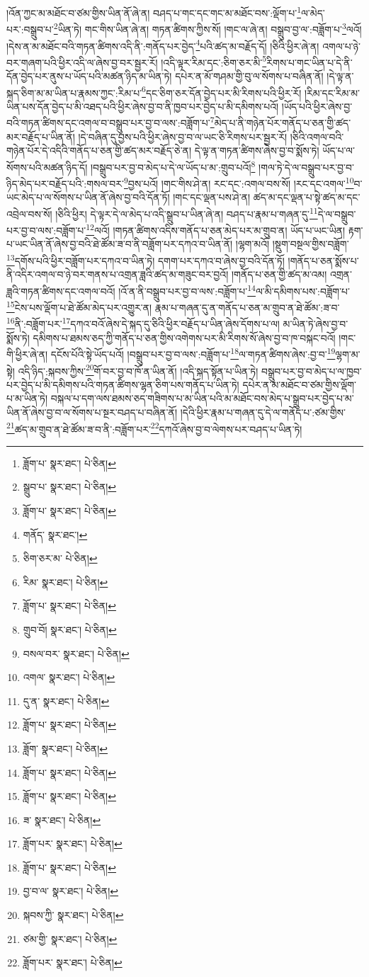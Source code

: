 །འོན་ཀྱང་མ་མཐོང་བ་ཙམ་གྱིས་ཡིན་ནོ་ཞེ་ན། བཤད་པ་གང་དང་གང་མ་མཐོང་བས་:ལྡོག་པ་\footnote{ཟློག་པ་  སྣར་ཐང་།  པེ་ཅིན། }ལ་མེད་པར་:བསྒྲུབ་པ་\footnote{སྒྲུབ་པ་  སྣར་ཐང་།  པེ་ཅིན། }ཡིན་ཏེ། གང་གིས་ཡིན་ཞེ་ན། གཏན་ཚིགས་ཀྱིས་སོ། །གང་ལ་ཞེ་ན། བསྒྲུབ་བྱ་ལ་:བཟློག་པ་\footnote{ཟློག་པ་  སྣར་ཐང་།  པེ་ཅིན། }ལའོ། །དེས་ན་མ་མཐོང་བའི་གཏན་ཚིགས་འདི་ནི་:གནོད་པར་བྱེད་\footnote{གནོད་  སྣར་ཐང་། }པའི་ཚད་མ་བརྗོད་དོ། །ཅིའི་ཕྱིར་ཞེ་ན། འགལ་པ་ཉེ་བར་གཞག་པའི་ཕྱིར་འདི་ལ་ཞེས་བྱ་བར་སྦྱར་རོ། །འདི་ལྟར་རིམ་དང་:ཅིག་ཅར་མི་\footnote{ཅིག་ཅར་མ་  པེ་ཅིན། }རིགས་པ་གང་ཡིན་པ་དེ་ནི་དོན་བྱེད་པར་ནུས་པ་ཡོད་པའི་མཚན་ཉིད་མ་ཡིན་ཏེ། དཔེར་ན་མོ་གཤམ་གྱི་བུ་ལ་སོགས་པ་བཞིན་ནོ། །དེ་ལྟ་ན་སྐད་ཅིག་མ་མ་ཡིན་པ་རྣམས་ཀྱང་:རིམ་པ་\footnote{རིམ་  སྣར་ཐང་།  པེ་ཅིན། }དང་ཅིག་ཅར་དོན་བྱེད་པར་མི་རིགས་པའི་ཕྱིར་རོ། །རིམ་དང་རིམ་མ་ཡིན་པས་དོན་བྱེད་པ་མི་འཐད་པའི་ཕྱིར་ཞེས་བྱ་བ་ནི་ཁྱབ་པར་བྱེད་པ་མི་དམིགས་པའོ། །ཡོད་པའི་ཕྱིར་ཞེས་བྱ་བའི་གཏན་ཚིགས་དང་འགལ་བ་བསྒྲུབ་པར་བྱ་བ་ལས་:བཟློག་པ་\footnote{ཟློག་པ་  སྣར་ཐང་།  པེ་ཅིན། }མེད་པ་ནི་གཉེན་པོར་གནོད་པ་ཅན་གྱི་ཚད་མར་བརྗོད་པ་ཡིན་ནོ། །དེ་བཞིན་དུ་བྱས་པའི་ཕྱིར་ཞེས་བྱ་བ་ལ་ཡང་ཅི་རིགས་པར་སྦྱར་རོ། །ཅིའི་འགལ་བའི་གཉེན་པོར་དེ་འདིའི་གནོད་པ་ཅན་གྱི་ཚད་མར་བརྗོད་ཅེ་ན། དེ་ལྟ་ན་གཏན་ཚིགས་ཞེས་བྱ་བ་སྨོས་ཏེ། ཡོད་པ་ལ་སོགས་པའི་མཚན་ཉིད་དོ། །བསྒྲུབ་པར་བྱ་བ་མེད་པ་དེ་ལ་ཡོད་པ་མ་:གྲུབ་པའོ།\footnote{གྲུབ་བོ།  སྣར་ཐང་།  པེ་ཅིན། } །གལ་ཏེ་དེ་ལ་བསྒྲུབ་པར་བྱ་བ་ཉིད་མེད་པར་བརྗོད་པའི་:གསལ་བར་\footnote{བསལ་བར་  སྣར་ཐང་།  པེ་ཅིན། }བྱས་པའོ། །གང་གིས་ཤེ་ན། རང་དང་:འགལ་བས་སོ། །རང་དང་འགལ་\footnote{འགལ་  སྣར་ཐང་།  པེ་ཅིན། }བ་ཡང་མེད་པ་ལ་སོགས་པ་ཡིན་ནོ་ཞེས་བྱ་བའི་དོན་ཏོ། །གང་དང་ལྡན་པས་ཤེ་ན། ཚད་མ་དང་ལྡན་པ་སྟེ་ཚད་མ་དང་འབྲེལ་བས་སོ། །ཅིའི་ཕྱིར། དེ་ལྟར་དེ་ལ་མེད་པ་འདི་སྒྲུབ་པ་ཡིན་ཞེ་ན། བཤད་པ་རྣམ་པ་གཞན་དུ་\footnote{དུ་ན་  སྣར་ཐང་།  པེ་ཅིན། }དེ་ལ་བསྒྲུབ་པར་བྱ་བ་ལས་:བཟློག་པ་\footnote{ཟློག་པ་  སྣར་ཐང་།  པེ་ཅིན། }ལའོ། །གཏན་ཚིགས་འདིས་གནོད་པ་ཅན་མེད་པར་མ་གྲུབ་ན། ཡོད་པ་ཡང་ཡིན། རྟག་པ་ཡང་ཡིན་ནོ་ཞེས་བྱ་བའི་ཐེ་ཚོམ་ཟ་བ་ནི་བཟློག་པར་དཀའ་བ་ཡིན་ནོ། །ལྷག་མའོ། །སྡུག་བསྔལ་གྱིས་བཟློག་\footnote{ཟློག་  སྣར་ཐང་།  པེ་ཅིན། }དགོས་པའི་ཕྱིར་བཟློག་པར་དཀའ་བ་ཡིན་ཏེ། དགག་པར་དཀའ་བ་ཞེས་བྱ་བའི་དོན་ཏོ། །གནོད་པ་ཅན་སྨོས་པ་ནི་འདིར་འགལ་བ་ཉེ་བར་གནས་པ་འགྲན་ཟླའི་ཚད་མ་གཟུང་བར་བྱའོ། །གནོད་པ་ཅན་གྱི་ཚད་མ་འམ། འགྲན་ཟླའི་གཏན་ཚིགས་དང་འགལ་བའོ། །འོ་ན་ནི་བསྒྲུབ་པར་བྱ་བ་ལས་:བཟློག་པ་\footnote{ཟློག་པ་  སྣར་ཐང་།  པེ་ཅིན། }ལ་མི་དམིགས་པས་:བཟློག་པ་\footnote{ཟློག་པ་  སྣར་ཐང་།  པེ་ཅིན། }ངེས་པས་ལྡོག་པ་ཐེ་ཚོམ་མེད་པར་འགྱུར་ན། རྣམ་པ་གཞན་དུ་ན་གནོད་པ་ཅན་མ་གྲུབ་ན་ཐེ་ཚོམ་:ཟ་བ་\footnote{ཟ་  སྣར་ཐང་།  པེ་ཅིན། }ནི་:བཟློག་པར་\footnote{ཟློག་པར་  སྣར་ཐང་།  པེ་ཅིན། }དཀའ་བའོ་ཞེས་དེ་སྐད་དུ་ཅིའི་ཕྱིར་བརྗོད་པ་ཡིན་ཞེས་དོགས་པ་ལ། མ་ཡིན་ཏེ་ཞེས་བྱ་བ་སྨོས་ཏེ། དམིགས་པ་ཐམས་ཅད་ཀྱི་གནོད་པ་ཅན་གྱིས་འགེགས་པར་མི་རིགས་སོ་ཞེས་བྱ་བ་ཁ་བསྐང་བའོ། །གང་གི་ཕྱིར་ཞེ་ན། དངོས་པོའི་སྟེ་ཡོད་པའོ། །བསྒྲུབ་པར་བྱ་བ་ལས་:བཟློག་པ་\footnote{ཟློག་པ་  སྣར་ཐང་།  པེ་ཅིན། }ལ་གཏན་ཚིགས་ཞེས་:བྱ་བ་\footnote{བྱ་བ་ལ་  སྣར་ཐང་།  པེ་ཅིན། }ལྷག་མ་སྟེ། འདི་ཉིད་:སྐབས་ཀྱིས་\footnote{སྐབས་ཀྱི་  སྣར་ཐང་།  པེ་ཅིན། }གོ་བར་བྱ་བ་ཁོ་ན་ཡིན་ནོ། །འདི་སྐད་སྟོན་པ་ཡིན་ཏེ། བསྒྲུབ་པར་བྱ་བ་མེད་པ་ལ་ཁྱབ་པར་བྱེད་པ་མི་དམིགས་པའི་གཏན་ཚིགས་ལྷན་ཅིག་པས་གནོད་པ་ཡིན་ཏེ། དཔེར་ན་མ་མཐོང་བ་ཙམ་གྱིས་ལྡོག་པ་མ་ཡིན་ཏེ། བསྐལ་པ་དག་ལས་ཐམས་ཅད་གཟིགས་པ་མ་ཡིན་པའི་མ་མཐོང་བས་མེད་པ་སྒྲུབ་པར་བྱེད་པ་མ་ཡིན་ནོ་ཞེས་བྱ་བ་ལ་སོགས་པ་སྔར་བཤད་པ་བཞིན་ནོ། །དེའི་ཕྱིར་རྣམ་པ་གཞན་དུ་དེ་ལ་གནོད་པ་:ཙམ་གྱིས་\footnote{ཙམ་གྱི་  སྣར་ཐང་།  པེ་ཅིན། }ཚད་མ་གྲུབ་ན་ཐེ་ཚོམ་ཟ་བ་ནི་:བཟློག་པར་\footnote{ཟློག་པར་  སྣར་ཐང་།  པེ་ཅིན། }དཀའོ་ཞེས་བྱ་བ་ལེགས་པར་བཤད་པ་ཡིན་ཏེ། 